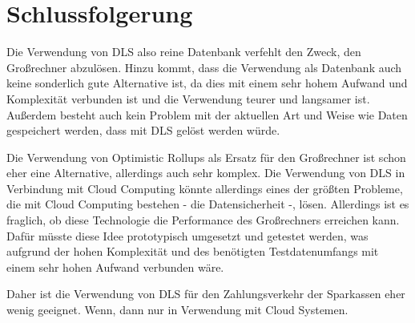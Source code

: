 \section{Schlussfolgerung}
\label{sec:Fazit}

Die Verwendung von DLS also reine Datenbank verfehlt den Zweck, den Großrechner abzulösen. 
Hinzu kommt, dass die Verwendung als Datenbank auch keine sonderlich gute Alternative ist, da dies mit einem sehr hohem Aufwand und Komplexität verbunden ist und die Verwendung teurer und langsamer ist.
Außerdem besteht auch kein Problem mit der aktuellen Art und Weise wie Daten gespeichert werden, dass mit DLS gelöst werden würde.

\noindent
Die Verwendung von Optimistic Rollups als Ersatz für den Großrechner ist schon eher eine Alternative, allerdings auch sehr komplex.
Die Verwendung von DLS in Verbindung mit Cloud Computing könnte allerdings eines der größten Probleme, die mit Cloud Computing bestehen - die Datensicherheit -, lösen.
Allerdings ist es fraglich, ob diese Technologie die Performance des Großrechners erreichen kann.
Dafür müsste diese Idee prototypisch umgesetzt und getestet werden, was aufgrund der hohen Komplexität und des benötigten Testdatenumfangs mit einem sehr hohen Aufwand verbunden wäre.

\noindent
Daher ist die Verwendung von DLS für den Zahlungsverkehr der Sparkassen eher wenig geeignet.
Wenn, dann nur in Verwendung mit Cloud Systemen.